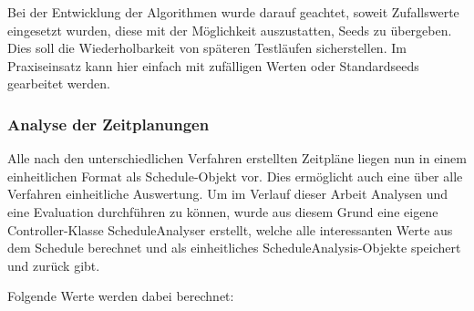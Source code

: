 Bei der Entwicklung der Algorithmen wurde darauf geachtet, soweit Zufallswerte eingesetzt wurden, diese mit der Möglichkeit auszustatten, Seeds zu übergeben. Dies soll die Wiederholbarkeit von späteren Testläufen sicherstellen. Im Praxiseinsatz kann hier einfach mit zufälligen Werten oder Standardseeds gearbeitet werden.


\subsubsection{Analyse der Zeitplanungen}


Alle nach den unterschiedlichen Verfahren erstellten Zeitpläne liegen nun in einem einheitlichen Format als Schedule-Objekt vor. Dies ermöglicht auch eine über alle Verfahren einheitliche Auswertung. Um im Verlauf dieser Arbeit Analysen und eine Evaluation durchführen zu können, wurde aus diesem Grund eine eigene Controller-Klasse ScheduleAnalyser erstellt, welche alle interessanten Werte aus dem Schedule berechnet und als einheitliches ScheduleAnalysis-Objekte speichert und zurück gibt. 

Folgende Werte werden dabei berechnet:


